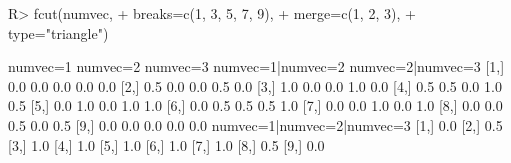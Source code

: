 \begin{Schunk}
% --begin: "fcut.merge2"
\begin{Sinput}
R> fcut(numvec,
+       breaks=c(1, 3, 5, 7, 9),
+       merge=c(1, 2, 3),
+       type="triangle")
\end{Sinput}
\begin{Soutput}
      numvec=1 numvec=2 numvec=3 numvec=1|numvec=2 numvec=2|numvec=3
 [1,]      0.0      0.0      0.0               0.0               0.0
 [2,]      0.5      0.0      0.0               0.5               0.0
 [3,]      1.0      0.0      0.0               1.0               0.0
 [4,]      0.5      0.5      0.0               1.0               0.5
 [5,]      0.0      1.0      0.0               1.0               1.0
 [6,]      0.0      0.5      0.5               0.5               1.0
 [7,]      0.0      0.0      1.0               0.0               1.0
 [8,]      0.0      0.0      0.5               0.0               0.5
 [9,]      0.0      0.0      0.0               0.0               0.0
      numvec=1|numvec=2|numvec=3
 [1,]                        0.0
 [2,]                        0.5
 [3,]                        1.0
 [4,]                        1.0
 [5,]                        1.0
 [6,]                        1.0
 [7,]                        1.0
 [8,]                        0.5
 [9,]                        0.0
\end{Soutput}
%
% --end: "fcut.merge2"
\end{Schunk}
